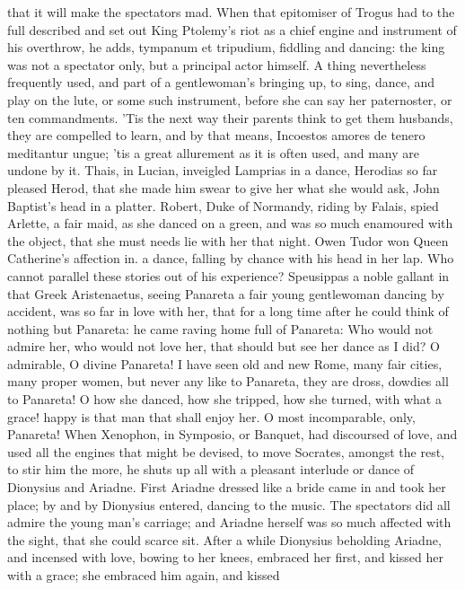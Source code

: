 {that it will make the spectators mad. When that epitomiser of
Trogus had to the full described and set out King Ptolemy's riot
as a chief engine and instrument of his overthrow, he adds, tympanum et
tripudium, fiddling and dancing: the king was not a spectator only, but
a principal actor himself. A thing nevertheless frequently used, and
part of a gentlewoman's bringing up, to sing, dance, and play on the
lute, or some such instrument, before she can say her paternoster, or
ten commandments. 'Tis the next way their parents think to get them
husbands, they are compelled to learn, and by that means,
Incoestos amores de tenero meditantur ungue; 'tis a great
allurement as it is often used, and many are undone by it. Thais, in
Lucian, inveigled Lamprias in a dance, Herodias so far pleased Herod,
that she made him swear to give her what she would ask, John Baptist's
head in a platter. Robert, Duke of Normandy, riding by Falais,
spied Arlette, a fair maid, as she danced on a green, and was so much
enamoured with the object, that she must needs lie with her that
night. Owen Tudor won Queen Catherine's affection in. a dance, falling
by chance with his head in her lap. Who cannot parallel these stories
out of his experience? Speusippas a noble gallant in that Greek
Aristenaetus, seeing Panareta a fair young gentlewoman dancing by
accident, was so far in love with her, that for a long time after he
could think of nothing but Panareta: he came raving home full of
Panareta: Who would not admire her, who would not love her, that should
but see her dance as I did? O admirable, O divine Panareta! I have seen
old and new Rome, many fair cities, many proper women, but never any
like to Panareta, they are dross, dowdies all to Panareta! O how she
danced, how she tripped, how she turned, with what a grace! happy is
that man that shall enjoy her. O most incomparable, only, Panareta!
When Xenophon, in Symposio, or Banquet, had discoursed of love, and
used all the engines that might be devised, to move Socrates, amongst
the rest, to stir him the more, he shuts up all with a pleasant
interlude or dance of Dionysius and Ariadne. First Ariadne
dressed like a bride came in and took her place; by and by Dionysius
entered, dancing to the music. The spectators did all admire the young
man's carriage; and Ariadne herself was so much affected with the
sight, that she could scarce sit. After a while Dionysius beholding
Ariadne, and incensed with love, bowing to her knees, embraced her
first, and kissed her with a grace; she embraced him again, and kissed
}
